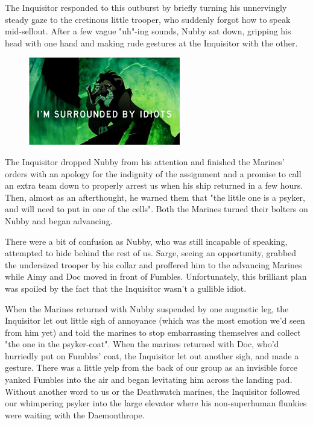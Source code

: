 The Inquisitor responded to this outburst by briefly turning his unnervingly steady gaze to the cretinous little trooper, who suddenly forgot how to speak mid-sellout. 
After a few vague "uh"-ing sounds, Nubby sat down, gripping his head with one hand and making rude gestures at the Inquisitor with the other.

\begin{figure}
	\begin{center}
		\includegraphics[width=\figwidth]{pics/16/2.png}
	\end{center}
\end{figure}
The Inquisitor dropped Nubby from his attention and finished the Marines' orders with an apology for the indignity of the assignment and a promise to call an extra team down to properly arrest us when his ship returned in a few hours. 
Then, almost as an afterthought, he warned them that "the little one is a psyker, and will need to put in one of the cells". 
Both the Marines turned their bolters on Nubby and began advancing.

There were a bit of confusion as Nubby, who was still incapable of speaking, attempted to hide behind the rest of us. 
Sarge, seeing an opportunity, grabbed the undersized trooper by his collar and proffered him to the advancing Marines while Aimy and Doc moved in front of Fumbles. 
Unfortunately, this brilliant plan was spoiled by the fact that the Inquisitor wasn't a gullible idiot. 


When the Marines returned with Nubby suspended by one augmetic leg, the Inquisitor let out little sigh of annoyance (which was the most emotion we'd seen from him yet) and told the marines to stop embarrassing themselves and collect "the one in the psyker-coat". 
When the marines returned with Doc, who'd hurriedly put on Fumbles' coat, the Inquisitor let out another sigh, and made a gesture. 
There was a little yelp from the back of our group as an invisible force yanked Fumbles into the air and began levitating him across the landing pad. 
Without another word to us or the Deathwatch marines, the Inquisitor followed our whimpering psyker into the large elevator where his non-superhuman flunkies were waiting with the Daemonthrope.

